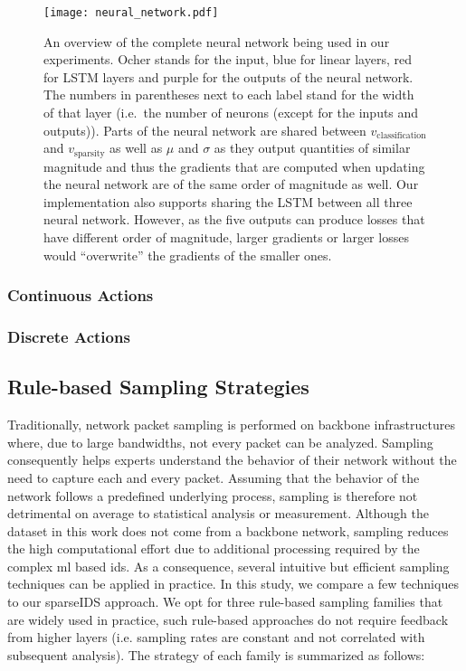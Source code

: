 \documentclass[conference]{IEEEtran}
\begin{document}
\begin{figure}
\centering
  \texttt{[image: neural\_network.pdf]}
  \caption{An overview of the complete neural network being used in our experiments. Ocher stands for the input, blue for linear layers, red for LSTM layers and purple for the outputs of the neural network. The numbers in parentheses next to each label stand for the width of that layer (i.e.~the number of neurons (except for the inputs and outputs)). Parts of the neural network are shared between $v_\text{classification}$ and $v_\text{sparsity}$ as well as $\mu$ and $\sigma$ as they output quantities of similar magnitude and thus the gradients that are computed when updating the neural network are of the same order of magnitude as well. Our implementation also supports sharing the LSTM between all three neural network. However, as the five outputs can produce losses that have different order of magnitude, larger gradients or larger losses would ``overwrite'' the gradients of the smaller ones.}
  \label{rnn:neuralNetworkArchitecture}
\end{figure}


\subsubsection{Continuous Actions}


\subsubsection{Discrete Actions}


\subsection{Rule-based Sampling Strategies}
Traditionally, network packet sampling is performed on backbone infrastructures where, due to large bandwidths, not every packet can be analyzed. Sampling consequently helps experts understand the behavior of their network without the need to capture each and every packet. Assuming that the behavior of the network follows a predefined underlying process, sampling is therefore not detrimental on average to statistical analysis or measurement. Although the dataset in this work does not come from a backbone network, sampling reduces the high computational effort due to additional processing  required by the complex \gls{ml} based \gls{ids}. As a consequence, several intuitive but efficient sampling techniques can be applied in practice. In this study, we compare a few techniques to our sparseIDS approach. 
We opt for three rule-based sampling families that are widely used in practice, such rule-based approaches do not require feedback from higher layers (i.e. sampling rates are constant and not correlated with subsequent analysis). The strategy of each family is summarized as follows:
\end{document}
